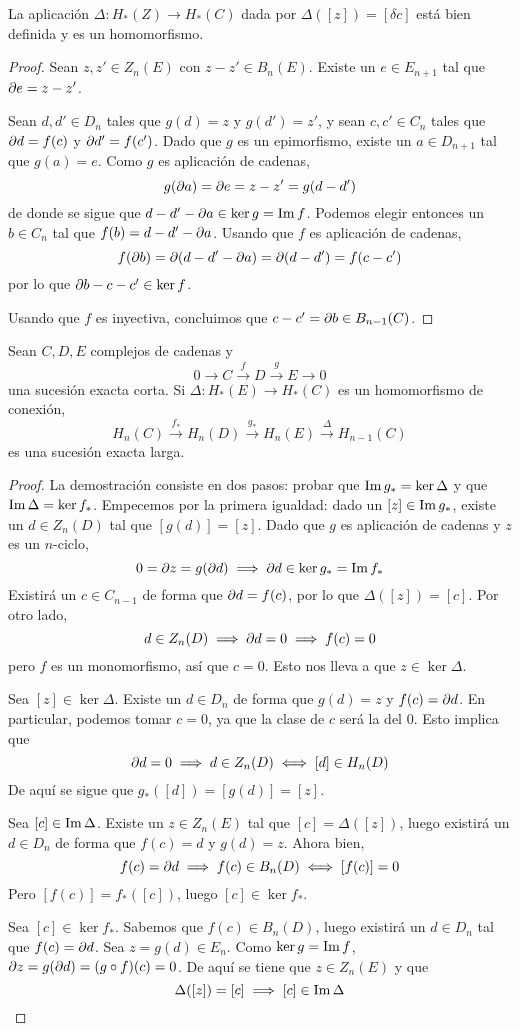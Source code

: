 \begin{proposition}
La aplicación $\Delta\colon H_*(Z) \longrightarrow H_*(C)$ dada por
$\Delta([z])=[\delta c]$ está bien definida y es un homomorfismo.
\end{proposition}

\begin{proof}
Sean $z,z' \in Z_n(E)$ con $z-z' \in B_n(E)$. Existe un $e \in E_{n+1}$ tal que
$\partial e=z-z'$.

Sean $d,d' \in D_n$ tales que $g(d)=z$ y $g(d')=z'$, y sean $c,c' \in C_n$ tales
que $\partial d=f(c)$ y $\partial d'=f(c')$. Dado que $g$ es un epimorfismo, existe un
$a \in D_{n+1}$ tal que $g(a)=e$. Como $g$ es aplicación de cadenas,
\[g(\partial a)=\partial e=z-z'=g(d-d')\]
de donde se sigue que $d-d'-\partial a\in \ker g=\operatorname{Im} f$. Podemos elegir entonces un
$b \in C_n$ tal que $f(b)=d-d'-\partial a$. Usando que $f$ es aplicación de cadenas,
\[f(\partial b)=\partial(d-d'-\partial a)=\partial (d- d')=f(c-c')\]
por lo que $\partial b-c-c'\in\ker f$.

Usando que $f$ es inyectiva, concluimos que $c-c'=\partial b \in B_{n-1}(C)$.
\end{proof}

\begin{theorem}
Sean $C, D, E$ complejos de cadenas y
\[0 \to C \xrightarrow{ f } D \xrightarrow{ g } E \to 0\]
una sucesión exacta corta. Si $\Delta\colon H_*(E) \to H_*(C)$ es un homomorfismo
de conexión,
\[H_n(C) \xrightarrow{ f_* } H_n(D) \xrightarrow{ g_* } H_n(E)
\xrightarrow{ \Delta } H_{n-1}(C)\] es una sucesión exacta larga.
\end{theorem}

\begin{proof}
La demostración consiste en dos pasos: probar que $\operatorname{Im} g_*=\ker \Delta$ y que
$\operatorname{Im} \Delta = \ker f_*$. Empecemos por la primera igualdad: dado un $[z] \in \operatorname{Im}
g_*$, existe un $d \in Z_n(D)$ tal que $[g(d)]=[z]$. Dado que $g$ es aplicación
de cadenas y $z$ es un $n$-ciclo,
\[0=\partial z=g(\partial d) \implies \partial d \in \ker g_*=\operatorname{Im} f_*\]
Existirá un $c \in C_{n-1}$ de forma que $\partial d=f(c)$, por lo que $\Delta([z])=
[c]$. Por otro lado,
\[d \in Z_n(D) \implies \partial d=0 \implies f(c)=0\]
pero $f$ es un monomorfismo, así que $c=0$. Esto nos lleva a que $z \in
\ker \Delta$.

Sea $[z] \in \ker \Delta$. Existe un $d \in D_n$ de forma que $g(d)=z$ y $f(c)=
\partial d$. En particular, podemos tomar $c=0$, ya que la clase de $c$ será la del 0.
Esto implica que
\[\partial d=0 \implies d \in Z_n(D) \iff [d] \in H_n(D)\]
De aquí se sigue que $g_*([d])=[g(d)]=[z]$.

Sea $[c] \in \operatorname{Im} \Delta$. Existe un $z \in Z_n(E)$ tal que $[c]=\Delta([z])$, luego
existirá un $d \in D_n$ de forma que $f(c)=d$ y $g(d)=z$. Ahora bien,
\[f(c)= \partial d \implies f(c) \in B_n(D) \iff [f(c)]=0\]
Pero $[f(c)]=f_*([c])$, luego $[c] \in \ker f_*$.

Sea $[c] \in \ker f_*$. Sabemos que $f(c) \in B_n(D)$, luego existirá un
$d \in D_n$ tal que $f(c)=\partial d$. Sea $z=g(d) \in E_n$. Como $\ker g=\operatorname{Im} f$,
$\partial z=g(\partial d)=(g\circ f)(c)=0$. De aquí se tiene que $z \in Z_n(E)$ y que
\[\Delta([z])=[c] \implies [c] \in \operatorname{Im} \Delta\]
\end{proof}
